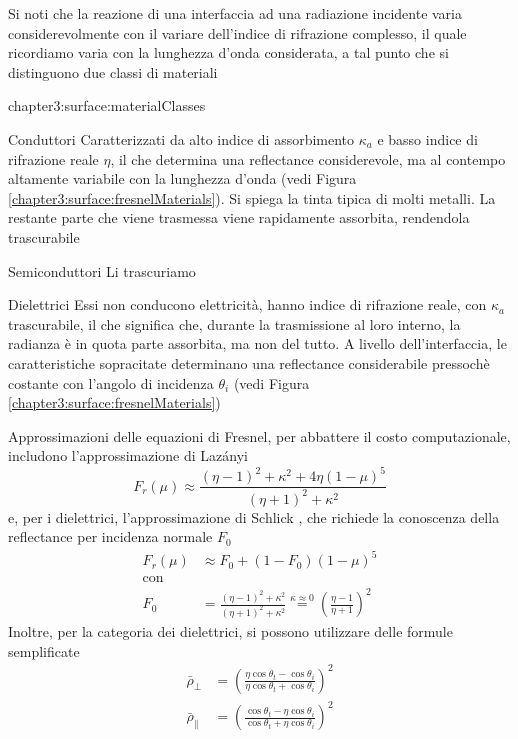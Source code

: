 Si noti che la reazione di una interfaccia ad una radiazione incidente varia considerevolmente con il variare dell'indice di rifrazione complesso,
il quale ricordiamo varia con la lunghezza d'onda considerata, a tal punto che si distinguono due classi di materiali
\begin{altDescription}{chapter3:surface:materialClasses}\label{chapter3:surface:materialClasses}
	\item[Conduttori] Caratterizzati da alto indice di assorbimento $\kappa_a$ e basso indice di rifrazione reale $\eta$, 
		il che determina una reflectance considerevole, ma al contempo altamente variabile con la lunghezza d'onda (vedi 
		Figura \ref{chapter3:surface:fresnelMaterials}). Si spiega la tinta tipica di molti metalli. La restante parte che 
		viene trasmessa viene rapidamente assorbita, rendendola trascurabile
	\item[Semiconduttori] Li trascuriamo
	\item[Dielettrici] Essi non conducono elettricit\`a, hanno indice di rifrazione reale, con $\kappa_a$ trascurabile, il che significa che, durante
		la trasmissione al loro interno, la radianza \`e in quota parte assorbita, ma non del tutto. A livello dell'interfaccia, le caratteristiche
		sopracitate determinano una reflectance considerabile pressoch\`e costante con l'angolo di incidenza $\theta_i$ (vedi Figura 
		\ref{chapter3:surface:fresnelMaterials})
\end{altDescription}
Approssimazioni delle equazioni di Fresnel, per abbattere il costo computazionale, includono l'approssimazione di Laz\'anyi \cite{laza-fresnel}
\begin{equation}\label{chapter3:surface:lazaFresnel}
	F_r(\mu) \approx \frac{(\eta-1)^2+\kappa^2+4\eta(1-\mu)^5}{(\eta+1)^2+\kappa^2}
\end{equation}
e, per i dielettrici, l'approssimazione di Schlick \cite{sch-fresnel}, che richiede la conoscenza della reflectance per incidenza normale $F_0$
\begin{align}\label{chapter3:surface:schFresnel}
	F_r(\mu) &\approx F_0+(1-F_0)(1-\mu)^5 \\
	\text{con} \nonumber \\
	F_0 &= \frac{(\eta-1)^2+\kappa^2}{(\eta+1)^2+\kappa^2} \stackrel{\kappa\approx0}{=} \left(\frac{\eta-1}{\eta+1}\right)^2 \nonumber
\end{align}
Inoltre, per la categoria dei dielettrici, si possono utilizzare delle formule semplificate
\begin{align}\label{chapter3:surface:fresnelDielectric}
	\bar{\rho}_\perp &= \left(\frac{\eta\cos\theta_t-\cos\theta_i}{\eta\cos\theta_t+\cos\theta_i}\right)^2 \\
	\bar{\rho}_\parallel &= \left(\frac{\cos\theta_t-\eta\cos\theta_i}{\cos\theta_t+\eta\cos\theta_i}\right)^2
\end{align}
